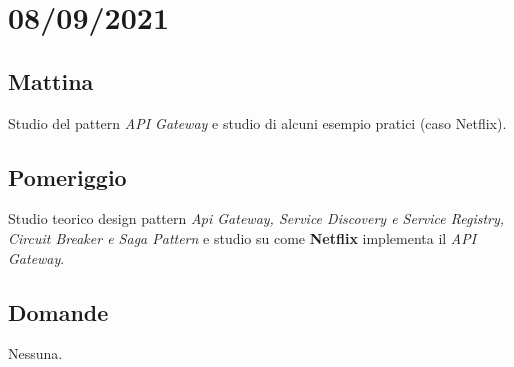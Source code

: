\section{08/09/2021}
\subsection{Mattina}
Studio del pattern \textit{API Gateway} e studio di alcuni esempio pratici (caso Netflix).
\subsection{Pomeriggio}
Studio teorico design pattern \textit{Api Gateway, Service Discovery e Service Registry, Circuit Breaker e Saga Pattern} e studio su come \textbf{Netflix} implementa il \textit{API Gateway}.
\subsection{Domande}
Nessuna.

